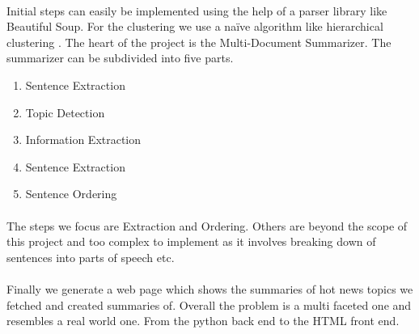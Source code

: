 \paragraph{} Initial steps can easily be implemented using the help of a parser library like Beautiful Soup\cite{BeautifulSoup}. For the clustering we use a naïve algorithm like hierarchical clustering \cite{HClustering}. The heart of the project is the Multi-Document Summarizer. The summarizer can be subdivided into five parts.
\begin{enumerate}[1. ]
 \item Sentence Extraction
 \item Topic Detection
 \item Information Extraction
 \item Sentence Extraction
 \item Sentence Ordering
\end{enumerate}
	
\paragraph{} The steps we focus are Extraction and Ordering. Others are beyond the scope of this project and too complex to implement as it involves breaking down of sentences into parts of speech etc.

\paragraph{} Finally we generate a web page which shows the summaries of hot news topics we fetched and created summaries of. Overall the problem is a multi faceted one and resembles a real world one. From the python back end to the HTML front end.
